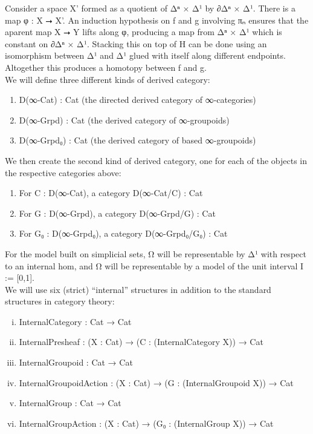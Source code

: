 \documentclass{book}
\theoremstyle{definition}
\begin{document}
Consider a space X' formed as a quotient of Δⁿ × Δ¹ by ∂Δⁿ × Δ¹. There is a map φ : X ⭢ X'. An induction hypothesis on f and g involving πₙ ensures that the aparent map X ⭢ Y lifts along φ, producing a map from Δⁿ × Δ¹ which is constant on ∂Δⁿ × Δ¹. Stacking this on top of H can be done using an isomorphism between Δ¹ and Δ¹ glued with itself along different endpoints. Altogether this produces a homotopy between f and g.\\

We will define three different kinds of derived category:\\

\begin{enumerate}
\item D(∞-Cat) : Cat (the directed derived category of ∞-categories)
\item D(∞-Grpd) : Cat (the derived category of ∞-groupoids)
\item D(∞-Grpd₀) : Cat (the derived category of based ∞-groupoids)
\end{enumerate}

We then create the second kind of derived category, one for each of the objects in the respective categories above:

\begin{enumerate}
\item For C : D(∞-Cat), a category D(∞-Cat/C) : Cat
\item For G : D(∞-Grpd), a category D(∞-Grpd/G) : Cat
\item For G₀ : D(∞-Grpd₀), a category D(∞-Grpd₀/G₀) : Cat
\end{enumerate}

For the model built on simplicial sets, Ω⃗ will be representable by Δ¹ with respect to an internal hom, and Ω⃡ will be representable by a model of the unit interval I := [0,1].\\

We will use six (strict) ``internal'' structures in addition to the standard structures in category theory:

\begin{enumerate}[(i)]
\item InternalCategory : Cat → Cat 
\item InternalPresheaf : (X : Cat) → (C : (InternalCategory X)) → Cat
\item InternalGroupoid : Cat → Cat
\item InternalGroupoidAction : (X : Cat) → (G : (InternalGroupoid X)) → Cat
\item InternalGroup : Cat → Cat
\item InternalGroupAction : (X : Cat) → (G₀ : (InternalGroup X)) → Cat   
\end{enumerate}
\end{document}
